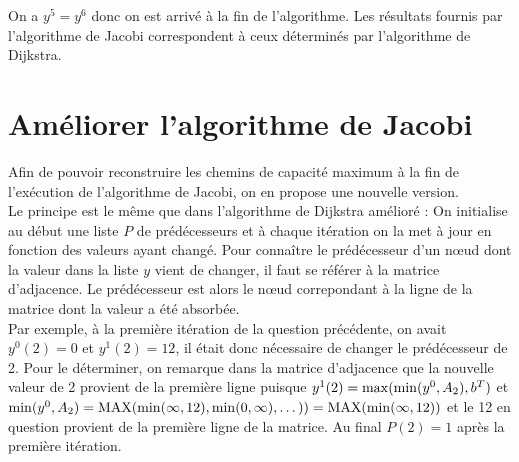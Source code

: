 \documentclass{article}
\begin{document}
On a $y^5 = y^6$ donc on est arrivé à la fin de l'algorithme. Les
résultats fournis par l'algorithme de Jacobi correspondent à ceux
déterminés par l'algorithme de Dijkstra.

\section{Améliorer l'algorithme de Jacobi}

Afin de pouvoir reconstruire les chemins de capacité maximum à la fin
de l'exécution de l'algorithme de Jacobi, on en propose une nouvelle
version.\\

Le principe est le même que dans l'algorithme de Dijkstra amélioré :
On initialise au début une liste $P$ de prédécesseurs et à chaque
itération on la met à jour en fonction des valeurs ayant changé. Pour
connaître le prédécesseur d'un n\oe ud dont la valeur dans la liste
$y$ vient de changer, il faut se référer à la matrice d'adjacence. Le
prédécesseur est alors le n\oe ud correpondant à la ligne de la
matrice dont la valeur a été absorbée.\\

Par exemple, à la première itération de la question précédente, on
avait $y^0(2) = 0$ et $y^1(2) = 12$, il était donc nécessaire de
changer le prédécesseur de 2. Pour le déterminer, on remarque dans la
matrice d'adjacence que la nouvelle valeur de 2 provient de la
première ligne puisque $y^1(2) = \operatorname{max}(\operatorname{min}(y^0,A_2),b^T)$ et
$\operatorname{min}(y^0,A_2) = \operatorname{MAX}(\operatorname{min}(\infty,12),\operatorname{min}(0,\infty),\dots)) =
\operatorname{MAX}(\operatorname{min}(\infty,12))$ et le 12 en question provient de la première
ligne de la matrice. Au final $P(2) = 1$ après la première itération.
\end{document}
